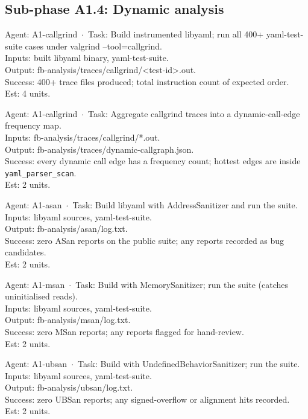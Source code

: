 \documentclass[12pt]{article}
\theoremstyle{definition}
\theoremstyle{remark}
\newenvironment{tasklist}{%
  \begingroup\raggedright
  \begin{description}[style=nextline, leftmargin=1.8cm, itemsep=0.4em]
}{%
  \end{description}
  \endgroup
}
\begin{document}
\subsection{Sub-phase A1.4: Dynamic analysis}

\begin{tasklist}

\item[T16.] {\ttfamily [~] Agent: A1-callgrind~$\cdot$~Task: Build instrumented libyaml; run all 400+ yaml-test-suite cases under valgrind --tool=callgrind.}\\
Inputs: built libyaml binary, yaml-test-suite.\\
Output: fb-analysis/traces/callgrind/<test-id>.out.\\
Success: 400+ trace files produced; total instruction count of expected order.\\
Est: 4 units.

\item[T17.] {\ttfamily [~] Agent: A1-callgrind~$\cdot$~Task: Aggregate callgrind traces into a dynamic-call-edge frequency map.}\\
Inputs: fb-analysis/traces/callgrind/*.out.\\
Output: fb-analysis/traces/dynamic-callgraph.json.\\
Success: every dynamic call edge has a frequency count; hottest edges are inside \verb|yaml_parser_scan|.\\
Est: 2 units.

\item[T18.] {\ttfamily [~] Agent: A1-asan~$\cdot$~Task: Build libyaml with AddressSanitizer and run the suite.}\\
Inputs: libyaml sources, yaml-test-suite.\\
Output: fb-analysis/asan/log.txt.\\
Success: zero ASan reports on the public suite; any reports recorded as bug candidates.\\
Est: 2 units.

\item[T19.] {\ttfamily [~] Agent: A1-msan~$\cdot$~Task: Build with MemorySanitizer; run the suite (catches uninitialised reads).}\\
Inputs: libyaml sources, yaml-test-suite.\\
Output: fb-analysis/msan/log.txt.\\
Success: zero MSan reports; any reports flagged for hand-review.\\
Est: 2 units.

\item[T20.] {\ttfamily [~] Agent: A1-ubsan~$\cdot$~Task: Build with UndefinedBehaviorSanitizer; run the suite.}\\
Inputs: libyaml sources, yaml-test-suite.\\
Output: fb-analysis/ubsan/log.txt.\\
Success: zero UBSan reports; any signed-overflow or alignment hits recorded.\\
Est: 2 units.

\end{tasklist}
\end{document}
